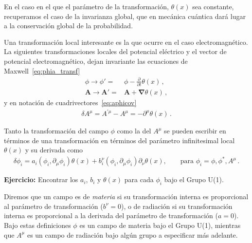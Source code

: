 En el caso en el que el parámetro de la transformación, $\theta(x)$ sea constante, recuperamos el caso de la invarianza global, que en mecánica cuántica dará lugar a la conservación global de la probabilidad. 

Una transformación local interesante es la que ocurre en el caso electromagnético. La siguientes transformaciones locales del potencial eléctrico y el vector de potencial electromagnético, dejan invariante las ecuaciones de Maxwell~\eqref{eq:phia_transf}
\begin{align}
  \phi \to \phi'=&\phi-\frac{\partial}{\partial t}\theta(x)\,,\nonumber\\
  \mathbf{A} \to \mathbf{A}'=&\mathbf{A}+ \boldsymbol{\nabla}\theta(x)\,,
\end{align}
y en notación de cuadrivectores~\eqref{eq:aphicov}
\begin{align}
  \delta A^{\mu}=A^{\prime\mu}-A^{\mu}=-\partial^\mu \theta(x)\,.
\end{align}

\begin{frame}
Tanto la transformación del campo $\phi$ como la del $A^{\mu}$ se pueden escribir en términos de una transformación en términos del parámetro infinitesimal local $\theta(x)$ y su derivada como
\begin{align}
\label{eq:dfi}
  \delta\phi_i= a_{i}\left( \phi_{i},\partial_{\mu}\phi_{i} \right) \theta(x)+b^{\nu}_i \left( \phi_{i},\partial_{\mu}\phi_{i} \right) \partial_{\nu}\theta(x),\qquad \text{para $\phi_{i}=\phi,\phi^{*},A^{\mu}$}\,.
\end{align}
\end{frame}
\textbf{Ejercicio:} Encontrar los $a_i$, $b_i$ y  $\theta(x)$ para cada $\phi_i$ bajo el Grupo U(1).

Diremos que un campo es de \emph{materia} si su transformación interna es proporcional al parámetro de transformación ($b^{\nu}=0$), o de radiación si su transformación interna es proporcional a la derivada del parámetro de transformación ($a=0$). Bajo estas definiciones $\phi$ es un campo de materia bajo el Grupo U(1), mientras que $A^{\mu}$ es un campo de radiación bajo algún grupo a especificar más adelante. 

